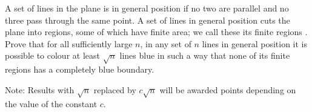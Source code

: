 A set of lines in the plane is in 
general position
 if no two are parallel and no three pass through the same point. A set of lines in general position cuts the plane into regions, some of which have finite area; we call these its 
finite regions
. Prove that for all sufficiently large 
$n$, 
 in any set of 
$n$
 lines in general position it is possible to colour at least 
$\sqrt{n}$
 lines blue in such a way that none of its finite regions has a completely blue boundary.

Note: Results with 
$\sqrt{n}$
 replaced by 
$c\sqrt{n}$
 will be awarded points depending on the value of the constant 
$c$.


